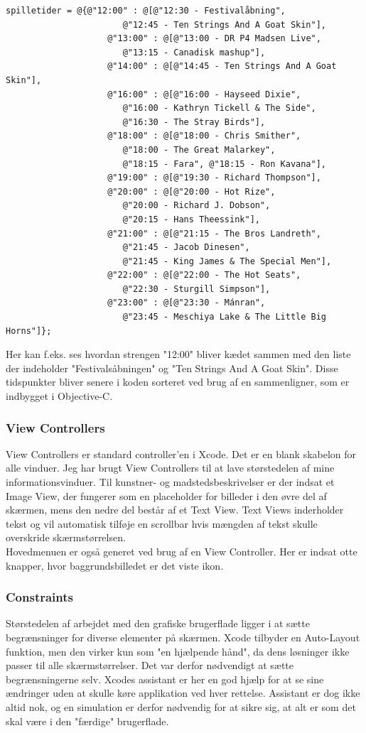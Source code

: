 \documentclass[a4paper,10pt,titlepage]{article}
\begin{document}
\begin{verbatim}
spilletider = @{@"12:00" : @[@"12:30 - Festivalåbning", 
                       @"12:45 - Ten Strings And A Goat Skin"],
                    @"13:00" : @[@"13:00 - DR P4 Madsen Live", 
                       @"13:15 - Canadisk mashup"],
                    @"14:00" : @[@"14:45 - Ten Strings And A Goat Skin"],
                    @"16:00" : @[@"16:00 - Hayseed Dixie", 
                       @"16:00 - Kathryn Tickell & The Side", 
                       @"16:30 - The Stray Birds"],
                    @"18:00" : @[@"18:00 - Chris Smither", 
                       @"18:00 - The Great Malarkey", 
                       @"18:15 - Fara", @"18:15 - Ron Kavana"],
                    @"19:00" : @[@"19:30 - Richard Thompson"],
                    @"20:00" : @[@"20:00 - Hot Rize", 
                       @"20:00 - Richard J. Dobson", 
                       @"20:15 - Hans Theessink"],
                    @"21:00" : @[@"21:15 - The Bros Landreth", 
                       @"21:45 - Jacob Dinesen", 
                       @"21:45 - King James & The Special Men"],
                    @"22:00" : @[@"22:00 - The Hot Seats", 
                       @"22:30 - Sturgill Simpson"],
                    @"23:00" : @[@"23:30 - Mánran", 
                       @"23:45 - Meschiya Lake & The Little Big Horns"]};
\end{verbatim}
Her kan f.eks. ses hvordan strengen "12:00" bliver kædet sammen med den liste der indeholder "Festivalsåbningen" og "Ten Strings And A Goat Skin". Disse tidspunkter bliver senere i koden sorteret ved brug af en sammenligner, som er indbygget i Objective-C.
\subsubsection{View Controllers}
View Controllers er standard controller'en i Xcode. Det er en blank skabelon for alle vinduer. Jeg har brugt View Controllers til at lave størstedelen af mine informationsvinduer. Til kunstner- og madstedsbeskrivelser er der indsat et Image View, der fungerer som en placeholder for billeder i den øvre del af skærmen, mens den nedre del består af et Text View. Text Views inderholder tekst og vil automatisk tilføje en scrollbar hvis mængden af tekst skulle overskride skærmstørrelsen. \\
Hovedmenuen er også generet ved brug af en View Controller. Her er indsat otte knapper, hvor baggrundsbilledet er det viste ikon. \\
\subsubsection{Constraints}
Størstedelen af arbejdet med den grafiske brugerflade ligger i at sætte begrænsninger for diverse elementer på skærmen. Xcode tilbyder en Auto-Layout funktion, men den virker kun som "en hjælpende hånd", da dens løsninger ikke passer til alle skærmstørrelser. Det var derfor nødvendigt at sætte begrænsningerne selv. Xcodes assistant er her en god hjælp for at se sine ændringer uden at skulle køre applikation ved hver rettelse. Assistant er dog ikke altid nok, og en simulation er derfor nødvendig for at sikre sig, at alt er som det skal være i den "færdige" brugerflade.
\end{document}
